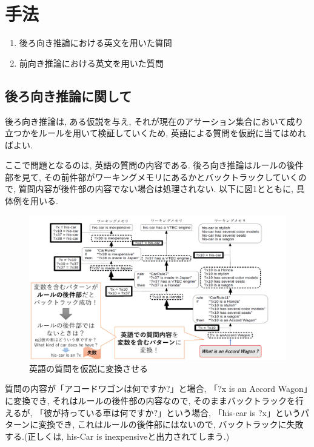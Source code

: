 \documentclass[uplatex,12pt]{jsarticle}
\begin{document}
\section{手法}
\begin{enumerate}
\item 後ろ向き推論における英文を用いた質問
\item 前向き推論における英文を用いた質問
\end{enumerate}

\subsection{後ろ向き推論に関して}
後ろ向き推論は, ある仮説を与え, それが現在のアサーション集合において成り立つかをルールを用いて検証していくため, 英語による質問を仮説に当てはめればよい.

ここで問題となるのは, 英語の質問の内容である. 後ろ向き推論はルールの後件部を見て, その前件部がワーキングメモリにあるかとバックトラックしていくので, 質問内容が後件部の内容でない場合は処理されない. 以下に図1とともに, 具体例を用いる.

\begin{figure}[htbp]
 \begin{center}
  \includegraphics[width = 12cm, pagebox = cropbox, clip]{images/後ろ向き推論_仮説の立て方.pdf}
 \end{center}
 \caption[]{英語の質問を仮説に変換させる}\label{fig:fig1.1}
\end{figure}

質問の内容が「アコードワゴンは何ですか?」と場合, 「?x is an Accord Wagon」に変換でき, それはルールの後件部の内容なので, そのままバックトラックを行えるが, 「彼が持っている車は何ですか?」という場合, 「his-car is ?x」というパターンに変換でき, これはルールの後件部にはないので, バックトラックに失敗する.(正しくは, his-Car is inexpensiveと出力されてしまう.)
\end{document}
